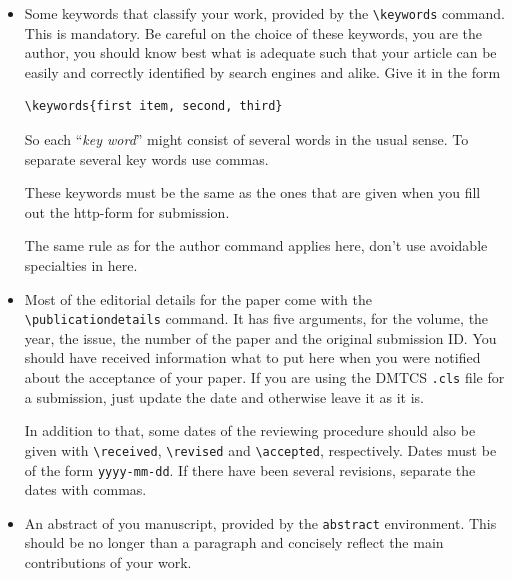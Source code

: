 \documentclass[
submission
]{dmtcs-episciences}
\begin{document}
\begin{itemize}
  The affiliations will appear as numbered lines in the order they are
  given. These numbers are the ones that you should use for the
  \verb!\affiliationmark! command for the authors that we have seen above.

  The text here should be the way how your institutions is usually
  cited and identified by others, this is \emph{not} the postal
  address, nor should it contain cryptic grant numbers, lab counters
  or anything of that kind.

  If you have to refer to such things as grant or lab numbers, that is
  things that are usually not interesting for your readers by for your
  controlling or evaluation institutions, put them in a \verb!\thanks!
  command.

  This also isn't a good place to give away your address, be it
  postal, email or phone number. Addresses change, papers
  shouldn't. Your episciences account gives you the opportunity to
  have all your address data up-to-date, always.
\item Some keywords that classify your work, provided by the
  \verb!\keywords!  command. This is mandatory. Be careful on the
  choice of these keywords, you are the author, you should know best
  what is adequate such that your article can be easily and correctly
  identified by search engines and alike. Give it in the form
\begin{verbatim}
\keywords{first item, second, third}
\end{verbatim}
  So each ``\emph{key word}'' might consist of several words in the
  usual sense. To separate several key words use commas.

  These keywords must be the same as the ones that are given when you
  fill out the http-form for submission.

  The same rule as for the author command applies here, don't use
  avoidable specialties in here.
\item Most of the editorial details for the paper come with the
  \verb!\publicationdetails! command. It has five arguments, for the
  volume, the year, the issue, the number of the paper and the
  original submission ID. You should have received information what to
  put here when you were notified about the acceptance of your
  paper. If you are using the DMTCS \texttt{.cls} file for a
  submission, just update the date and otherwise leave it as it is.

  In addition to that, some dates of the reviewing procedure should
  also be given with \verb!\received!, \verb!\revised! and
  \verb!\accepted!, respectively. Dates must be of the form
  \texttt{yyyy-mm-dd}. If there have been several revisions, separate
  the dates with commas.
\item
  An abstract of you manuscript, provided by the \verb!abstract!
  environment. This should be no longer than a paragraph and concisely
  reflect the main contributions of your work.


\end{itemize}
\end{document}
